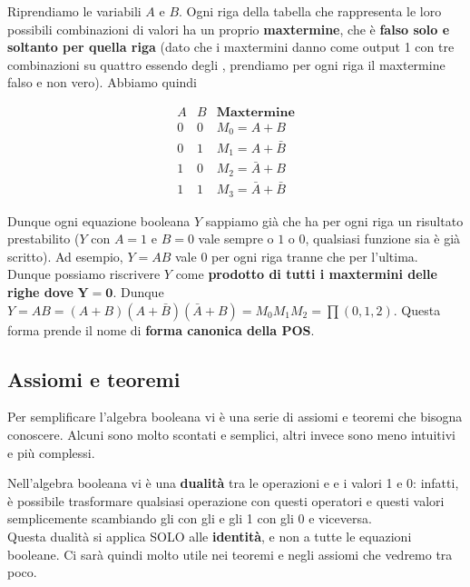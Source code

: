 \documentclass[11pt, a4paper, titlepage, oneside]{scrbook}
\begin{document}
Riprendiamo le variabili $A$ e $B$. Ogni riga della tabella che rappresenta le loro possibili combinazioni di valori ha un proprio \textbf{maxtermine}, che è \textbf{falso solo e soltanto per quella riga} (dato che i maxtermini danno come output 1 con tre combinazioni su quattro essendo degli , prendiamo per ogni riga il maxtermine falso e non vero). Abbiamo quindi

\[
\begin{array}{cc|c}
A & B & \textbf{Maxtermine} \\
\hline
0 & 0 & M_0 = A + B \\
0 & 1 & M_1 = A + \bar{B} \\
1 & 0 & M_2 = \bar{A} + B \\
1 & 1 & M_3 = \bar{A} + \bar{B}
\end{array}
\]

Dunque ogni equazione booleana $Y$ sappiamo già che ha per ogni riga un risultato prestabilito ($Y$ con $A = 1$ e $B = 0$ vale sempre o $1$ o $0$, qualsiasi funzione sia è già scritto). Ad esempio, $Y = AB$ vale 0 per ogni riga tranne che per l'ultima. Dunque possiamo riscrivere $Y$ come \textbf{prodotto di tutti i maxtermini delle righe dove} $\bm{Y = 0}$. Dunque \mbox{$Y = AB = (A + B) (A + \bar{B}) (\bar{A} + B) = M_0 M_1 M_2 = \prod(0,1,2)$}. Questa forma prende il nome di \textbf{forma canonica della POS}.

\subsection{Assiomi e teoremi}

Per semplificare l'algebra booleana vi è una serie di assiomi e teoremi che bisogna conoscere. Alcuni sono molto scontati e semplici, altri invece sono meno intuitivi e più complessi.

\begin{Definizione}
\label{def-dualità-algebra-booleana}
Nell'algebra booleana vi è una \textbf{dualità} tra le operazioni  e  e i valori 1 e 0: infatti, è possibile trasformare qualsiasi operazione con questi operatori e questi valori semplicemente scambiando gli  con gli  e gli 1 con gli 0 e viceversa. \\
\NB Questa dualità si applica SOLO alle \textbf{identità}, e non a tutte le equazioni booleane. Ci sarà quindi molto utile nei teoremi e negli assiomi che vedremo tra poco.
\end{Definizione}
\end{document}
